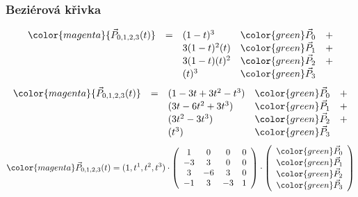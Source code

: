 \begin{frame}
\frametitle{Beziérová křivka}
  {\tiny
  \[
  \begin{array}{lclrc}
    \color{magenta}{\vec{P}_{0,1,2,3}(t)} &=& (1-t)^3&{\color{green}\vec{P}_0} &+ \\
                                       & & 3(1-t)^2(t)&{\color{green}\vec{P}_1} &+ \\
                                       & & 3(1-t)(t)^2&{\color{green}\vec{P}_2} &+ \\
                                       & & (t)^3&{\color{green}\vec{P}_3} &
  \end{array}
  \]
  }
  {\tiny
  \[
  \begin{array}{lclrc}
    \color{magenta}{\vec{P}_{0,1,2,3}(t)} &=& (1-3t+3t^2-t^3)&{\color{green}\vec{P}_0} &+ \\
                                       & & (3t-6t^2+3t^3)&{\color{green}\vec{P}_1} &+ \\
                                       & & (3t^2-3t^3)&{\color{green}\vec{P}_2} &+ \\
                                       & & (t^3)&{\color{green}\vec{P}_3} &
  \end{array}
  \]
  }
  {\tiny
$$
{\color{magenta}\vec{P}_{0,1,2,3}(t)}=(1,t^1,t^2,t^3)\cdot
\left(
\begin{array}{cccc}
 1 &  0 &  0 &  0 \\
-3 &  3 &  0 &  0 \\
 3 & -6 &  3 &  0 \\
-1 &  3 & -3 &  1
\end{array}
\right)
\cdot
\left(
\begin{array}{c}
  {\color{green}\vec{P}_{0}} \\
  {\color{green}\vec{P}_{1}} \\
  {\color{green}\vec{P}_{2}} \\
  {\color{green}\vec{P}_{3}} 
\end{array}
\right)
$$
  }
\end{frame}

